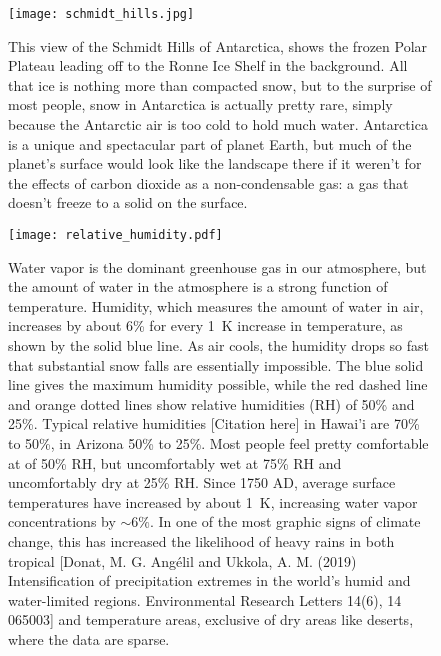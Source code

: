 \documentclass[amstex,12pt]{book}
\begin{document}
\begin{figure}[p]
\centering
\texttt{[image: schmidt\_hills.jpg]}%
\caption{This view of the Schmidt Hills of Antarctica, shows the frozen Polar Plateau leading
off to the Ronne Ice Shelf in the background. All that ice is nothing more than compacted snow, but
to the surprise of most people, snow in Antarctica is actually pretty rare, simply because the Antarctic air
is too cold to hold much water. Antarctica is a unique and spectacular part of planet Earth, but
much of the planet's surface would look like the landscape there if it weren't for the effects
of carbon dioxide as a non-condensable gas: a gas that doesn't freeze to a solid on the surface.}   
\label{fig:schmidt_hills}
\end{figure}


\begin{figure}[p]
\centering
\texttt{[image: relative\_humidity.pdf]}%
\caption{Water vapor is the dominant greenhouse gas in our atmosphere, but the amount of water in the atmosphere is a strong function of temperature. Humidity, which measures the amount of water in air, increases by about 6\% for every \SI{1}{\kelvin} increase in temperature, as shown by the solid blue line. As air cools, the humidity drops so fast that substantial snow falls are essentially impossible. The blue solid line gives the maximum humidity possible, while the red dashed line and orange dotted lines show relative humidities (RH) of 50\% and 25\%. Typical relative humidities [Citation here] in Hawai'i are 70\% to 50\%, in Arizona 50\% to 25\%. Most people feel pretty comfortable at of 50\% RH, but uncomfortably wet at 75\% RH and uncomfortably dry at 25\% RH. Since 1750 AD, average surface temperatures have increased by about \SI{1}{\kelvin}, increasing water vapor concentrations by $\sim 6\%$. In one of the most graphic signs of climate change, this has increased the likelihood of heavy rains in both tropical [Donat, M. G. Ang\'{e}lil and Ukkola, A. M. (2019) Intensification of precipitation extremes in the world's humid and water-limited regions. Environmental Research Letters 14(6), 14 065003] and temperature areas, exclusive of dry areas like deserts, where the data are sparse.}   
\label{fig:relative_humidity}
\end{figure}
\end{document}

